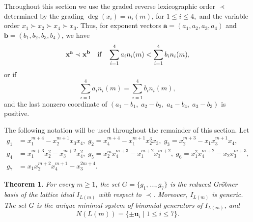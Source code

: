\documentclass[10pt,a4paper]{amsart}
\newtheorem{theorem}{Theorem}[section]
\begin{document}
Throughout this section we use the graded reverse lexicographic order
$\prec$ determined by the grading
$
\deg(x_i)=n_i(m)$, for $1\le i\le4,$
and the variable order
$
x_1\succ x_2\succ x_4\succ x_3.$
Thus, for exponent vectors
$\mathbf a=(a_1,a_2,a_3,a_4)$ and
$\mathbf b=(b_1,b_2,b_3,b_4)$,
we have
\[
{\bf x}^{\mathbf a}\prec {\bf x}^{\mathbf b}
\quad\text{if}\quad
\sum_{i=1}^4 a_i n_i(m)
<
\sum_{i=1}^4 b_i n_i(m),
\]
or if
\[
\sum_{i=1}^4 a_i n_i(m)
=
\sum_{i=1}^4 b_i n_i(m),
\]
and the last nonzero coordinate of
$
(a_1-b_1,\;a_2-b_2,\;a_4-b_4,\;a_3-b_3)$
is positive.


The following notation will be used throughout the remainder of this
section. Let
\[
\begin{aligned}
g_1&=x_1^{m+4}-x_2^{m+1}x_3x_4, \;
g_2=x_4^{m+4}-x_1^{m+1}x_2^3x_3, \;
g_3=x_2^{m+3}-x_1x_3^{m+1}x_4,\\
g_4&=x_1^{m+3}x_2^2-x_3^{m+2}x_4^2, \;
g_5=x_2^{m}x_4^{m+3}-x_1^{m+2}x_3^{m+2}, \;
g_6=x_1^2x_4^{m+2}-x_2x_3^{m+3},\\
g_7&=x_1x_2^{m+2}x_4^{m+1}-x_3^{2m+4}.
\end{aligned}
\]



\begin{theorem}\label{thm:groebner}
For every $m\ge1$, the set
$
G=\{g_1,\ldots,g_7\}$
is the reduced Gr\"obner basis of the lattice ideal $I_{L(m)}$ with
respect to $\prec$. Moreover, $I_{L(m)}$ is generic. The set $G$ is the unique minimal
system of binomial generators of $I_{L(m)}$, and
\[
N(L(m))
=
\{\pm\mathbf u_i\mid1\le i\le7\}.
\]
\end{theorem}
\end{document}
